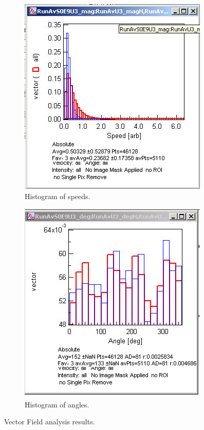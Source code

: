 \documentclass{article}
\begin{document}
\begin{figure}[!ht]
\begin{subfigure}{.5\textwidth}
  \centering
  \includegraphics[width=.8\linewidth]{img/image034.jpg}
  \caption{Histogram of speeds.}
  \label{fig:speedHist}
\end{subfigure}%
\begin{subfigure}{.5\textwidth}
  \centering
  \includegraphics[width=.8\linewidth]{img/image036.jpg}
  \caption{Histogram of angles.}
  \label{fig:angleHist}
\end{subfigure}
\caption{Vector Field analysis results.}
\label{fig:histograms}
\end{figure}
\end{document}
